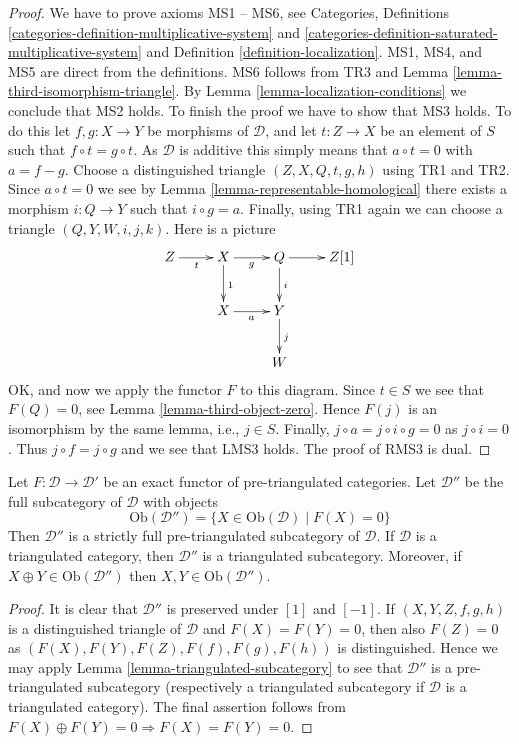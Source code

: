 \begin{proof}
We have to prove axioms MS1 -- MS6, see
Categories, Definitions \ref{categories-definition-multiplicative-system} and
\ref{categories-definition-saturated-multiplicative-system}
and
Definition \ref{definition-localization}.
MS1, MS4, and MS5 are direct from the definitions. MS6 follows from TR3 and
Lemma \ref{lemma-third-isomorphism-triangle}.
By
Lemma \ref{lemma-localization-conditions}
we conclude that MS2 holds. To finish the proof we have to show that
MS3 holds. To do this let $f, g : X \to Y$ be morphisms of $\mathcal{D}$,
and let $t : Z \to X$ be an element of $S$ such that $f \circ t = g \circ t$.
As $\mathcal{D}$ is additive this simply means that $a \circ t = 0$ with
$a = f - g$. Choose a distinguished triangle $(Z, X, Q, t, g, h)$ using
TR1 and TR2. Since $a \circ t = 0$ we see by
Lemma \ref{lemma-representable-homological}
there exists a morphism $i : Q \to Y$ such that $i \circ g = a$.
Finally, using TR1 again we can choose a triangle
$(Q, Y, W, i, j, k)$. Here is a picture
$$
\xymatrix{
Z \ar[r]_t & X \ar[r]_g \ar[d]^1 & Q \ar[r] \ar[d]^i & Z[1] \\
& X \ar[r]_a & Y \ar[d]^j \\
& & W
}
$$
OK, and now we apply the functor $F$ to this diagram.
Since $t \in S$ we see that $F(Q) = 0$, see
Lemma \ref{lemma-third-object-zero}.
Hence $F(j)$ is an isomorphism by the same lemma, i.e., $j \in S$.
Finally, $j \circ a = j \circ i \circ g = 0$ as $j \circ i = 0$.
Thus $j \circ f = j \circ g$ and we see that LMS3 holds.
The proof of RMS3 is dual.
\end{proof}

\begin{lemma}
\label{lemma-triangle-functor-kernel}
Let $F : \mathcal{D} \to \mathcal{D}'$ be an exact functor of
pre-triangulated categories. Let $\mathcal{D}''$ be the full subcategory
of $\mathcal{D}$ with objects
$$
\text{Ob}(\mathcal{D}'') =
\{X \in \text{Ob}(\mathcal{D}) \mid F(X) = 0\}
$$
Then $\mathcal{D}''$ is a strictly full pre-triangulated subcategory of
$\mathcal{D}$. If $\mathcal{D}$ is a triangulated category, then
$\mathcal{D}''$ is a triangulated subcategory.
Moreover, if $X \oplus Y \in \text{Ob}(\mathcal{D}'')$
then $X, Y \in \text{Ob}(\mathcal{D}'')$.
\end{lemma}

\begin{proof}
It is clear that $\mathcal{D}''$ is preserved under $[1]$ and $[-1]$.
If $(X, Y, Z, f, g, h)$ is a distinguished triangle of $\mathcal{D}$
and $F(X) = F(Y) = 0$, then also $F(Z) = 0$ as
$(F(X), F(Y), F(Z), F(f), F(g), F(h))$ is distinguished.
Hence we may apply
Lemma \ref{lemma-triangulated-subcategory}
to see that $\mathcal{D}''$ is a pre-triangulated subcategory (respectively
a triangulated subcategory if $\mathcal{D}$ is a triangulated category).
The final assertion follows from
$F(X) \oplus F(Y) = 0 \Rightarrow F(X) = F(Y) = 0$.
\end{proof}

